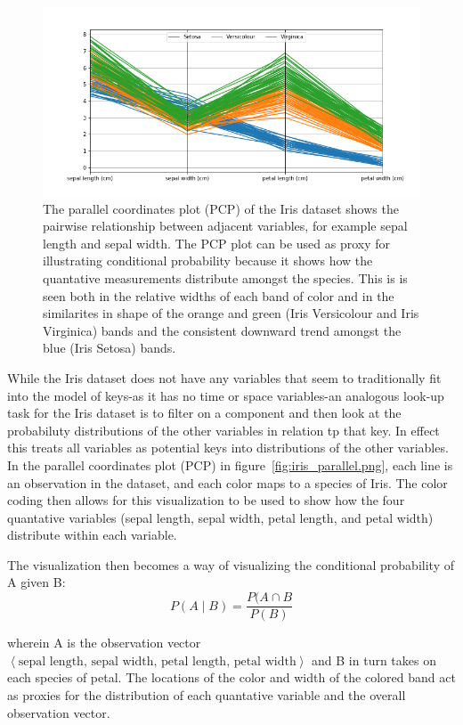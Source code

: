 \documentclass[letterpaper,onecolumn,titlepage]{Ythesis}
\begin{document}
\begin{figure}
\includegraphics[width=\textwidth]{intro/iris_parallel}
\caption{The parallel coordinates plot (PCP) of the Iris dataset shows the pairwise relationship between adjacent variables, for example sepal length and sepal width. The PCP plot can be used as proxy for illustrating conditional probability because it shows how the quantative measurements distribute amongst the species. This is is seen both in the relative widths of each band of color and in the similarites in shape of the orange and green (Iris Versicolour and Iris Virginica) bands and the consistent downward trend amongst the blue (Iris Setosa) bands.}
\label{fig:iris_parallel}
\end{figure}

While the Iris dataset does not have any variables that seem to traditionally fit into the model of keys-as it has no time or space variables-an analogous look-up task for the Iris dataset is to filter on a component and then look at the probabiluty distributions of the other variables in relation tp that key. In effect this treats all variables as potential keys into distributions of the other variables. In the parallel coordinates plot (PCP) in figure~\ref{fig:iris_parallel.png}, each line is an observation in the dataset, and each color maps to a species of Iris. The color coding then allows for this visualization to be used to show how the four quantative variables (sepal length, sepal width, petal length, and petal width) distribute within each variable. 

The visualization then becomes a way of visualizing the conditional probability of A given B:
\begin{equation}
P(A\mid B) = \frac{P(A \cap B}{P(B)} 
\end{equation}

wherein A is the observation vector $\left< \text{sepal length, sepal width, petal length, petal width} \right>$ and B in turn takes on each species of petal. The locations of the color and width of the colored band act as proxies for the distribution of each quantative variable and the overall observation vector. 
\end{document}
